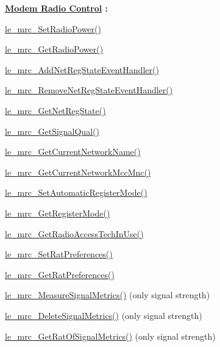 {\bfseries \hyperlink{c_mrc}{Modem Radio Control} \+:}
\begin{DoxyItemize}
\item \hyperlink{le__mrc__interface_8h_a78bd27d92337e2122320f41bcaa5480f}{le\+\_\+mrc\+\_\+\+Set\+Radio\+Power()}
\item \hyperlink{le__mrc__interface_8h_aac51332c6c84e460746eb1ad45c064d6}{le\+\_\+mrc\+\_\+\+Get\+Radio\+Power()}
\item \hyperlink{le__mrc__interface_8h_a929745b84719754d28f539540f71a552}{le\+\_\+mrc\+\_\+\+Add\+Net\+Reg\+State\+Event\+Handler()}
\item \hyperlink{le__mrc__interface_8h_a619adffdee5b1760348a1aa1331ac108}{le\+\_\+mrc\+\_\+\+Remove\+Net\+Reg\+State\+Event\+Handler()}
\item \hyperlink{le__mrc__interface_8h_a4f11e27862fef384c0023f5b538e543d}{le\+\_\+mrc\+\_\+\+Get\+Net\+Reg\+State()}
\item \hyperlink{le__mrc__interface_8h_a717aa0f4e4dc9a83b6adc2f26f3f0258}{le\+\_\+mrc\+\_\+\+Get\+Signal\+Qual()}
\item \hyperlink{le__mrc__interface_8h_a45fe1941f520c1e4a23b2794dd2a8232}{le\+\_\+mrc\+\_\+\+Get\+Current\+Network\+Name()}
\item \hyperlink{le__mrc__interface_8h_ac1a0c4fad80538c7df63176576e1d9a3}{le\+\_\+mrc\+\_\+\+Get\+Current\+Network\+Mcc\+Mnc()}
\item \hyperlink{le__mrc__interface_8h_acb434a9f91afb5b6639baf3678ee9388}{le\+\_\+mrc\+\_\+\+Set\+Automatic\+Register\+Mode()}
\item \hyperlink{le__mrc__interface_8h_a9ad2729c28e97ae450f7aee0865197f6}{le\+\_\+mrc\+\_\+\+Get\+Register\+Mode()}
\item \hyperlink{le__mrc__interface_8h_a3ad9533c467cec0902d5d165bb32d67b}{le\+\_\+mrc\+\_\+\+Get\+Radio\+Access\+Tech\+In\+Use()}
\item \hyperlink{le__mrc__interface_8h_a2d4abd391bc69c218538f5d8e1be4e01}{le\+\_\+mrc\+\_\+\+Set\+Rat\+Preferences()}
\item \hyperlink{le__mrc__interface_8h_ae9fa8655738c63e392c8dcc862bdb1d5}{le\+\_\+mrc\+\_\+\+Get\+Rat\+Preferences()}
\item \hyperlink{le__mrc__interface_8h_ad3662723a7ed47cf45d9a2eaaa1fb16e}{le\+\_\+mrc\+\_\+\+Measure\+Signal\+Metrics()} (only signal strength)
\item \hyperlink{le__mrc__interface_8h_a20addd98ee6cb07f9ee1a45be01b5203}{le\+\_\+mrc\+\_\+\+Delete\+Signal\+Metrics()} (only signal strength)
\item \hyperlink{le__mrc__interface_8h_a5564bace31c937bcef096e597f33d3a4}{le\+\_\+mrc\+\_\+\+Get\+Rat\+Of\+Signal\+Metrics()} (only signal strength)

\end{DoxyItemize}

